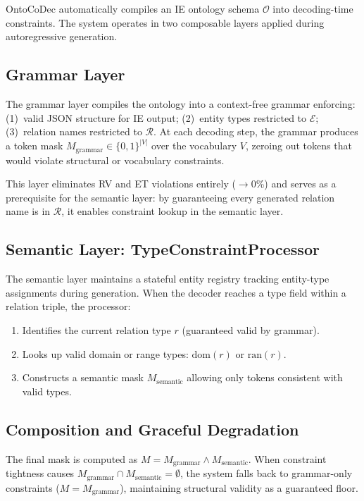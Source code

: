 \documentclass[11pt,a4paper]{article}
\newcommand{\sys}{OntoCoDec}
\begin{document}
\sys{} automatically compiles an IE ontology schema $\mathcal{O}$ into decoding-time constraints.
The system operates in two composable layers applied during autoregressive generation.

\subsection{Grammar Layer}

The grammar layer compiles the ontology into a context-free grammar enforcing:
(1)~valid JSON structure for IE output;
(2)~entity types restricted to $\mathcal{E}$;
(3)~relation names restricted to $\mathcal{R}$.
At each decoding step, the grammar produces a token mask $M_{\text{grammar}} \in \{0,1\}^{|V|}$ over the vocabulary $V$, zeroing out tokens that would violate structural or vocabulary constraints.

This layer eliminates RV and ET violations entirely ($\rightarrow$0\%) and serves as a prerequisite for the semantic layer: by guaranteeing every generated relation name is in $\mathcal{R}$, it enables constraint lookup in the semantic layer.

\subsection{Semantic Layer: TypeConstraintProcessor}

The semantic layer maintains a stateful entity registry tracking entity-type assignments during generation.
When the decoder reaches a type field within a relation triple, the processor:
\begin{enumerate}
  \item Identifies the current relation type $r$ (guaranteed valid by grammar).
  \item Looks up valid domain or range types: $\text{dom}(r)$ or $\text{ran}(r)$.
  \item Constructs a semantic mask $M_{\text{semantic}}$ allowing only tokens consistent with valid types.
\end{enumerate}

\subsection{Composition and Graceful Degradation}

The final mask is computed as $M = M_{\text{grammar}} \wedge M_{\text{semantic}}$.
When constraint tightness causes $M_{\text{grammar}} \cap M_{\text{semantic}} = \emptyset$, the system falls back to grammar-only constraints ($M = M_{\text{grammar}}$), maintaining structural validity as a guaranteed floor.
\end{document}
